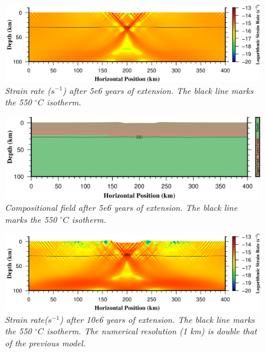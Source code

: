 \documentclass{article}
\begin{document}
\begin{figure}
\centering
\includegraphics[width=\textwidth]{cookbooks/continental_extension/continental_extension_cookbook_strainrate_5e6yr.png}
\caption{\it Strain rate ($s^{-1}$) after 5e6 years of extension. The black line marks the 550 $^\circ C$ isotherm.} 
\label{fig:continental_extension_cookbook_strainrate_5e6yr}
\end{figure}
\begin{figure}
\includegraphics[width=\textwidth]{cookbooks/continental_extension/continental_extension_cookbook_composition_5e6yr.png}
\caption{\it Compositional field after 5e6 years of extension. The black line marks the 550 $^\circ C$ isotherm.} 
\label{fig:continental_extension_cookbook_composition_5e6yr}
\end{figure}
\begin{figure}
\includegraphics[width=\textwidth]{cookbooks/continental_extension/continental_extension_cookbook_strainrate_highres_10e6yr.png}
\caption{\it Strain rate($s^{-1}$) after 10e6 years of extension. The black line marks the 550 $^\circ C$ isotherm. The numerical resolution (1 km) is double that of the previous model.} 
\label{fig:continental_extension_cookbook_strainrate_highres_10e6yr}
\end{figure}
 
\end{document}
